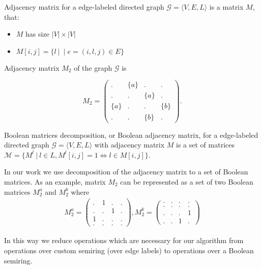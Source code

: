 \begin{definition}
Adjacency matrix for a edge-labeled directed graph $\mathcal{G} = \langle V,E,L \rangle$ is a matrix $M$, that:
\begin{itemize}
    \item $M$ has size $|V|\times|V|$
    \item $M[i,j] = \{l~|~\mid e = (i,l,j) \in E\}$
\end{itemize}
\end{definition}

Adjacency matrix $M_2$ of the graph $\mathcal{G}$ is 

$$
    M_2 =
    \begin{pmatrix}
    . & \{a\} & . & .     \\
    . & . & \{a\} & .     \\
    \{a\} & . & . & \{b\} \\
    . & . & \{b\} & .
    \end{pmatrix}.
$$

\begin{definition}
Boolean matrices decomposition, or Boolean adjacency matrix, 
for a edge-labeled directed graph $\mathcal{G} = 
\langle V,E,L \rangle$ with adjacency matrix $M$ is a set of matrices $\mathcal{M} = \{ M^l~|~l \in L,M^l[i,j] = 1 \iff l \in M[i,j]\}$.
\end{definition}

In our work we use decomposition of the adjacency matrix to a set of Boolean matrices. As an example, matrix $M_2$ can be represented as a set of two Boolean matrices $M_2^a$ and $M_2^b$ where
\begin{align}
M_2^{a} =
\begin{pmatrix}
    . & 1 & . & .   \\
    . & . & 1 & .   \\
    1 & . & . & .   \\
    . & . & . & .  
\end{pmatrix}, 
M_2^{b} =
\begin{pmatrix}      
    . & . & . & .   \\
    . & . & . & .   \\
    . & . & . & 1   \\
    . & . & 1 & . 
\end{pmatrix} \label{eq:boolean_decomposition_of_graph}
\end{align}

In this way we reduce operations which are necessary for our algorithm from operations over custom semiring (over edge labels) to operations over a Boolean semiring.

